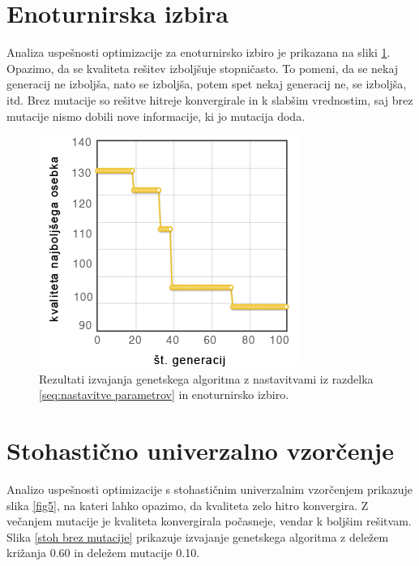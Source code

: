 \documentclass[a4paper, 12pt]{book}
\begin{document}
\section{Enoturnirska izbira}

Analiza uspe\v snosti optimizacije za enoturnirsko izbiro je prikazana na sliki \ref{fig1}. Opazimo, da se kvaliteta re\v sitev izbolj\v suje stopni\v casto. To pomeni, da se nekaj generacij ne izbolj\v sa, nato se izbolj\v sa, potem spet nekaj generacij ne, se izbolj\v sa, itd. Brez mutacije so re\v sitve hitreje konvergirale in k slab\v sim vrednostim, saj brez mutacije nismo dobili nove informacije, ki jo mutacija doda.
\begin{figure}
\centering
\includegraphics[scale=0.70]{enotur_izbira.png}
\caption{Rezultati izvajanja genetskega algoritma z nastavitvami iz razdelka \ref{seq:nastavitve parametrov} in enoturnirsko izbiro.}
\label{fig1}
\end{figure}

\section{Stohasti\v cno univerzalno vzor\v cenje}
Analizo uspe\v snosti optimizacije s stohasti\v cnim univerzalnim vzor\v cenjem prikazuje slika \ref{fig5}, na kateri lahko opazimo, da kvaliteta zelo hitro konvergira. Z ve\v canjem mutacije je kvaliteta konvergirala po\v casneje, vendar k bolj\v sim re\v sitvam. Slika \ref{stoh brez mutacije} prikazuje izvajanje genetskega algoritma z dele\v zem kri\v zanja 0.60 in dele\v zem mutacije 0.10.
\end{document}
